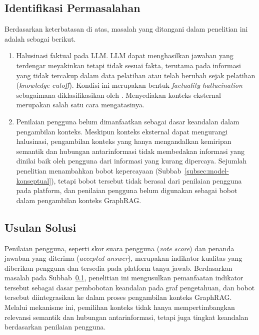 \subsection{Identifikasi Permasalahan}
\label{subsec:identifikasi-masalah-kondisi}

Berdasarkan keterbatasan di atas, masalah yang ditangani dalam penelitian ini adalah sebagai berikut.
\begin{enumerate}[label=\textbf{M\arabic*.}]
    \item Halusinasi faktual pada LLM.
    LLM dapat menghasilkan jawaban yang terdengar meyakinkan tetapi tidak sesuai fakta, terutama pada informasi yang tidak tercakup dalam data pelatihan atau telah berubah sejak pelatihan (\emph{knowledge cutoff}). Kondisi ini merupakan bentuk \emph{factuality hallucination} sebagaimana diklasifikasikan oleh \textcite{Huang2025}. Menyediakan konteks eksternal merupakan salah satu cara mengatasinya.

    \item Penilaian pengguna belum dimanfaatkan sebagai dasar keandalan dalam pengambilan konteks.
    Meskipun konteks eksternal dapat mengurangi halusinasi, pengambilan konteks yang hanya mengandalkan kemiripan semantik dan hubungan antarinformasi tidak membedakan informasi yang dinilai baik oleh pengguna dari informasi yang kurang dipercaya. Sejumlah penelitian menambahkan bobot kepercayaan (Subbab~\ref{subsec:model-konseptual}), tetapi bobot tersebut tidak berasal dari penilaian pengguna pada platform, dan penilaian pengguna belum digunakan sebagai bobot dalam pengambilan konteks GraphRAG.
\end{enumerate}


\subsection{Usulan Solusi}
\label{subsec:usulan-solusi}

Penilaian pengguna, seperti skor suara pengguna (\emph{vote score}) dan penanda jawaban yang diterima (\emph{accepted answer}), merupakan indikator kualitas yang diberikan pengguna dan tersedia pada platform tanya jawab. Berdasarkan masalah pada Subbab~\ref{subsec:identifikasi-masalah-kondisi}, penelitian ini mengusulkan pemanfaatan indikator tersebut sebagai dasar pembobotan keandalan pada graf pengetahuan, dan bobot tersebut diintegrasikan ke dalam proses pengambilan konteks GraphRAG. Melalui mekanisme ini, pemilihan konteks tidak hanya mempertimbangkan relevansi semantik dan hubungan antarinformasi, tetapi juga tingkat keandalan berdasarkan penilaian pengguna.

